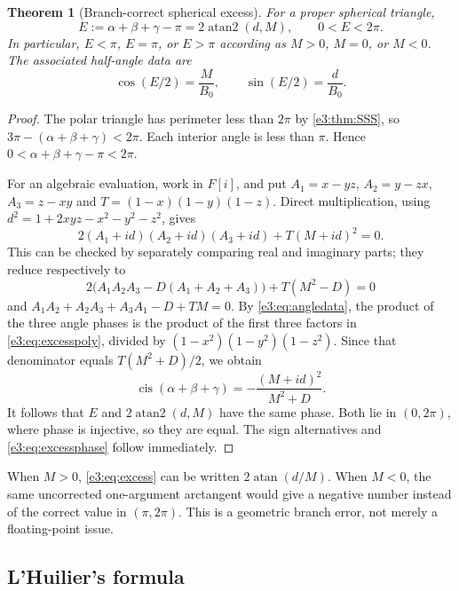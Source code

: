 \documentclass[11pt,letterpaper]{article}
\numberwithin{equation}{section}
\newtheorem{theorem}{Theorem}[section]
\theoremstyle{definition}
\theoremstyle{remark}
\newcommand{\cis}{\operatorname{cis}}
\newcommand{\atan}{\operatorname{atan}}
\newcommand{\atantwo}{\operatorname{atan2}}
\begin{document}
\begin{theorem}[Branch-correct spherical excess]\label{e3:thm:excess}
For a proper spherical triangle,
\begin{equation}\label{e3:eq:excess}
 E:=\alpha+\beta+\gamma-\pi
   =2\atantwo(d,M),\qquad 0<E<2\pi.
\end{equation}
In particular, $E<\pi$, $E=\pi$, or $E>\pi$ according as $M>0$, $M=0$, or
$M<0$. The associated half-angle data are
\begin{equation}\label{e3:eq:excessphase}
 \cos(E/2)=\frac{M}{B_0},\qquad
 \sin(E/2)=\frac{d}{B_0}.
\end{equation}
\end{theorem}
\begin{proof}
The polar triangle has perimeter less than $2\pi$ by \cref{e3:thm:SSS}, so
$3\pi-(\alpha+\beta+\gamma)<2\pi$. Each interior angle is less than
$\pi$. Hence $0<\alpha+\beta+\gamma-\pi<2\pi$.

For an algebraic evaluation, work in $F[i]$, and put
$A_1=x-yz$, $A_2=y-zx$, $A_3=z-xy$ and
$T=(1-x)(1-y)(1-z)$. Direct multiplication, using
$d^2=1+2xyz-x^2-y^2-z^2$, gives
\begin{equation}\label{e3:eq:excesspoly}
 2(A_1+id)(A_2+id)(A_3+id)+T(M+id)^2=0.
\end{equation}
This can be checked by separately comparing real and imaginary parts;
they reduce respectively to
\[
 2\bigl(A_1A_2A_3-D(A_1+A_2+A_3)\bigr)+T(M^2-D)=0
\]
and $A_1A_2+A_2A_3+A_3A_1-D+TM=0$.
By \cref{e3:eq:angledata}, the product of the three angle phases is the product
of the first three factors in \cref{e3:eq:excesspoly}, divided by
$(1-x^2)(1-y^2)(1-z^2)$. Since that denominator equals
$T(M^2+D)/2$, we obtain
\[
 \cis(\alpha+\beta+\gamma)=-\frac{(M+id)^2}{M^2+D}.
\]
It follows that $E$ and $2\atantwo(d,M)$ have the same phase. Both lie in
$(0,2\pi)$, where phase is injective, so they are equal. The sign alternatives
and \cref{e3:eq:excessphase} follow immediately.
\end{proof}

When $M>0$, \cref{e3:eq:excess} can be written $2\atan(d/M)$. When $M<0$,
the same uncorrected one-argument arctangent would give a negative number
instead of the correct value in $(\pi,2\pi)$. This is a geometric branch error,
not merely a floating-point issue.

\subsection{L'Huilier's formula}
\end{document}
